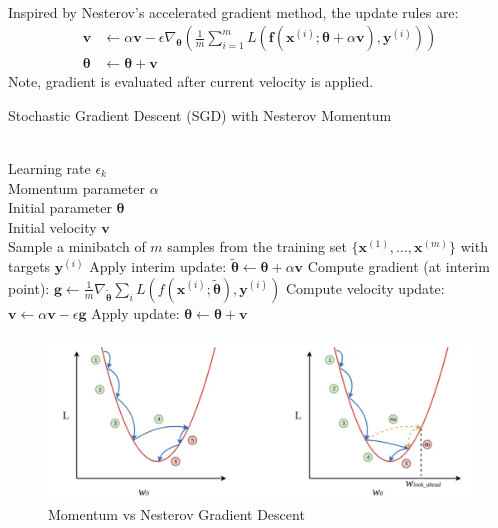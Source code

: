 \begin{remark} \\
Inspired by Nesterov's accelerated gradient method, the update rules are:
\begin{align}
\bm{v} &\leftarrow \alpha \bm{v} - \epsilon \nabla_{\bm{\theta}} \left(\frac{1}{m} \sum\limits_{i=1}^m L(\bm{f}(\bm{x}^{(i)}; \bm{\theta} + \alpha \bm{v}), \bm{y}^{(i)}) \right) \nonumber \\
\bm{\theta} &\leftarrow \bm{\theta} + \bm{v} \nonumber
\end{align}
Note, gradient is evaluated after current velocity is applied.
\end{remark}

\begin{breakablealgorithm}
\caption{Stochastic Gradient Descent (SGD) with Nesterov Momentum}
\begin{algorithmic}
\Require \\
Learning rate $\epsilon_k$\\
Momentum parameter $\alpha$\\
Initial parameter $\bm{\theta}$\\
Initial velocity $\bm{v}$\\

\State Sample a minibatch of $m$ samples from the training set $\{\bm{x}^{(1)}, \ldots, \bm{x}^{(m)} \}$ with targets $\bm{y}^{(i)}$
\State Apply interim update: $\tilde{\bm{\theta}} \leftarrow \bm{\theta} + \alpha \bm{v}$
\State Compute gradient (at interim point): $\bm{g} \leftarrow \frac{1}{m} \nabla_{\tilde{\bm{\theta}}} \sum_{i} L(f(\bm{x}^{(i)}; \tilde{\bm{\theta}}), \bm{y}^{(i)})$
\State Compute velocity update: $\bm{v} \leftarrow \alpha \bm{v} - \epsilon \bm{g}$
\State Apply update: $\bm{\theta} \leftarrow \bm{\theta} + \bm{v}$
\EndWhile
\end{algorithmic}
\end{breakablealgorithm}

\begin{figure}[H]
\centering
\includegraphics[scale=0.4]{figures/math/nesterov}
\caption{Momentum vs Nesterov Gradient Descent}
\end{figure}


